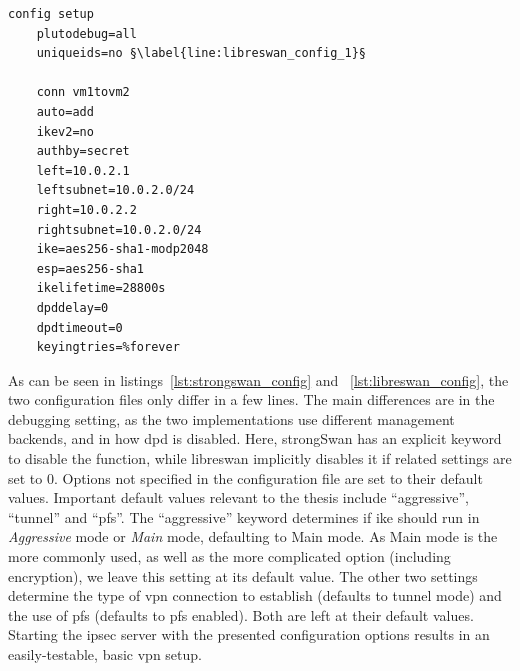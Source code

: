 \begin{lstlisting}[mathescape=true, float=ht, caption=Configuration options of the libreswan server., label=lst:libreswan_config, escapechar=§]
	config setup
	plutodebug=all
	uniqueids=no §\label{line:libreswan_config_1}§
	
	conn vm1tovm2
	auto=add
	ikev2=no
	authby=secret
	left=10.0.2.1 
	leftsubnet=10.0.2.0/24
	right=10.0.2.2
	rightsubnet=10.0.2.0/24
	ike=aes256-sha1-modp2048
	esp=aes256-sha1
	ikelifetime=28800s
	dpddelay=0
	dpdtimeout=0
	keyingtries=%forever
\end{lstlisting}

As can be seen in listings~\ref{lst:strongswan_config} and ~\ref{lst:libreswan_config}, the two configuration files only differ in a few lines. The main differences are in the debugging setting, as the two implementations use different management backends, and in how \ac{dpd} is disabled. Here, strongSwan has an explicit keyword to disable the function, while libreswan implicitly disables it if related settings are set to 0. Options not specified in the configuration file are set to their default values. Important default values relevant to the thesis include ``aggressive'', ``tunnel'' and ``pfs''. The ``aggressive'' keyword determines if \ac{ike} should run in \emph{Aggressive} mode or \emph{Main} mode, defaulting to Main mode. As Main mode is the more commonly used, as well as the more complicated option (including encryption), we leave this setting at its default value. The other two settings determine the type of \ac{vpn} connection to establish (defaults to tunnel mode) and the use of \ac{pfs} (defaults to \ac{pfs} enabled). Both are left at their default values. Starting the \ac{ipsec} server with the presented configuration options results in an easily-testable, basic \ac{vpn} setup.
\newpage


